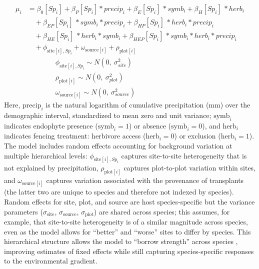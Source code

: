 \documentclass[12pt]{article}\usepackage[]{graphicx}\usepackage[dvipsnames]{xcolor}
\begin{document}
\begin{equation}\label{eq:full_model}
\begin{aligned}
\mu_i &= \beta_0[Sp_i] + \beta_P[Sp_i] * precip_i + \beta_{E}[Sp_i]\, * symb_i + \beta_{H}[Sp_i]\, * herb_i \\
&\quad + \beta_{EP}[Sp_i]\, * symb_i * precip_i 
       + \beta_{HP}[Sp_i]\, * herb_i * precip_i \\
&\quad + \beta_{HE}[Sp_i]\, * herb_i * symb_i + \beta_{HEP}[Sp_i]\, *symb_i * herb_i * precip_i \\
&\quad  + \phi_{\text{site}[i],Sp_i} 
       + \omega_{\text{source}[i]} 
       + \rho_{\text{plot}[i]}
       \\
&\quad \quad \quad \quad \phi_{\text{site}[i],Sp_i} \sim N(0,\ \sigma^2_{site})\\
&\quad \quad \quad \quad \rho_{\text{plot}[i]} \sim N(0,\ \sigma^2_{plot})\\
&\quad \quad \quad \quad \omega_{\text{source}[i]} \sim N(0,\ \sigma^2_{source})
\end{aligned}
\end{equation}
Here, $\mathrm{precip}_i$ is the natural logarithm of cumulative precipitation (mm) over the demographic interval, standardized to mean zero and unit variance; $\mathrm{symb}_i$ indicates endophyte presence ($\mathrm{symb}_i = 1$) or absence ($\mathrm{symb}_i = 0$), and $\mathrm{herb}_i$ indicates fencing treatment: herbivore access ($\mathrm{herb}_i = 0$) or exclusion ($\mathrm{herb}_i = 1$).
The model includes random effects accounting for background variation at multiple hierarchical levels: $\phi_{\text{site}[i],Sp_i}$ captures site-to-site heterogeneity that is not explained by precipitation, $\rho_{\text{plot}[i]}$ captures plot-to-plot variation within sites, and $\omega_{\text{source}[i]}$ captures variation associated with the provenance of transplants (the latter two are unique to species and therefore not indexed by species).
Random effects for site, plot, and source are host species-specific but the variance parameters ($\sigma_{\text{site}}$, $\sigma_{\text{source}}$, $\sigma_{\text{plot}}$) are shared across species; this assumes, for example, that site-to-site heterogeneity is of a similar magnitude across species, even as the model allows for ``better'' and ``worse'' sites to differ by species. 
This hierarchical structure allows the model to ``borrow strength'' across species \citep{gelman2007data}, improving estimates of fixed effects while still capturing species-specific responses to the environmental gradient.
\end{document}

